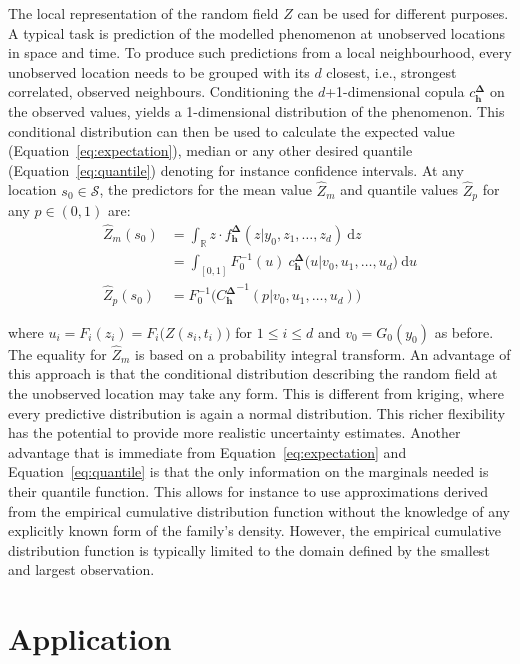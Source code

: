 \documentclass[article,nojss]{jss}
\begin{document}
The local representation of the random field $Z$ can be used for different purposes. A typical task is prediction of the modelled phenomenon at unobserved locations in space and time. To produce such predictions from a local neighbourhood, every unobserved location needs to be grouped with its $d$ closest, i.e., strongest correlated, observed neighbours. Conditioning the $d$+1-dimensional copula $c^\mathbf{\Delta}_\mathbf{h}$ on the observed values, yields a 1-dimensional distribution of the phenomenon. This conditional distribution can then be used to calculate the expected value (Equation~\ref{eq:expectation}), median or any other desired quantile (Equation~\ref{eq:quantile}) denoting for instance confidence intervals. At any location $s_0 \in \mathcal{S}$, the predictors for the mean value $\widehat{Z}_m$ and quantile values $\widehat{Z}_p$ for any $p \in (0,1)$ are:
\begin{align}
\widehat{Z}_m(s_0) &= \int_\mathbb{R} z \cdot f^\mathbf{\Delta}_{\mathbf{h}}(z | y_0, z_1, \dots, z_d) \ \mathrm{d}z \nonumber \\
&=\int_{[0,1]} F_0^{-1}(u) \ c^\mathbf{\Delta}_{\mathbf{h}}\big(u|v_0, u_1,\dots,u_d\big) \ \mathrm{d}u \label{eq:expectation} \\
\widehat{Z}_p(s_0) &= F_0^{-1}\big({C^\mathbf{\Delta}_\mathbf{h}}^{-1}(p|v_0,u_1,\dots,u_d)\big) \label{eq:quantile}
\end{align}

where $u_i = F_i(z_i)=F_i\big(Z(s_i,t_i)\big)$ for $1 \leq i \leq d$ and $v_0=G_0(y_0)$ as before. The equality for $\widehat{Z}_m$ is based on a probability integral transform. An advantage of this approach is that the conditional distribution describing the random field at the unobserved location may take any form. This is different from kriging, where every predictive distribution is again a normal distribution. This richer flexibility has the potential to provide more realistic uncertainty estimates. Another advantage that is immediate from Equation~\ref{eq:expectation} and Equation~\ref{eq:quantile} is that the only information on the marginals needed is their quantile function. This allows for instance to use approximations derived from the empirical cumulative distribution function without the knowledge of any explicitly known form of the family's density. However, the empirical cumulative distribution function is typically limited to the domain defined by the smallest and largest observation.

\section{Application}
\label{sec:application}
\end{document}
